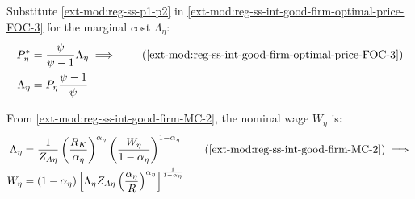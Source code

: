 \documentclass[../thesis.tex]{subfiles}
\begin{document}
Substitute \ref{ext-mod:reg-ss-p1-p2} in \ref{ext-mod:reg-ss-int-good-firm-optimal-price-FOC-3} for the marginal cost $\Lambda_{\eta}$:
\begin{align}
	P_{\eta}^{\ast} &= \frac{\psi}{\psi-1} \Lambda_{\eta} \implies \tag{\ref{ext-mod:reg-ss-int-good-firm-optimal-price-FOC-3}} \\
	\Lambda_{\eta} &= P_{\eta} \frac{\psi-1}{\psi} \label{ext-mod:reg-ss-marginal-cost}
\end{align}

From \ref{ext-mod:reg-ss-int-good-firm-MC-2}, the nominal wage $W_{\eta}$ is:
\begin{alignat}{2}
	\Lambda_{\eta} &= \frac{1}{Z_{A\eta}} \left( \frac{R_{K}}{{\alpha_{\eta}}} \right)^{{\alpha_{\eta}}} \left( \frac{W_{\eta}}{1-\alpha_{\eta}} \right)^{1-\alpha_{\eta}} \tag{\ref{ext-mod:reg-ss-int-good-firm-MC-2}} \implies \\
	W_{\eta} &= \left( 1 - \alpha_{\eta} \right) \left[ \Lambda_{\eta} Z_{A\eta} \left( \frac{\alpha_{\eta}}{R} \right)^{\alpha_{\eta}} \right]^{\frac{1}{1 - \alpha_{\eta}}} \label{ext-mod:reg-ss-nominal-wage}
\end{alignat}

\begin{comment}
	Substitute \ref{ext-mod:reg-ss-nominal-wage} in \ref{ext-mod:reg-ss-int-good-firm-MC-2} for the technology level of region 2, $Z_{A2}$:
	\begin{align}
		\Lambda_{\eta} &= \frac{1}{Z_{A\eta}} \left( \frac{R_K}{{\alpha_{\eta}}} \right)^{{\alpha_{\eta}}} \left( \frac{W}{1-\alpha_{\eta}} \right)^{1-\alpha_{\eta}} \implies \tag{\ref{ext-mod:reg-ss-int-good-firm-MC-2}} \\
		Z_{A2} &= \frac{1}{\Lambda_{}} \left( \frac{R_K}{{\alpha_{\eta}}} \right)^{{\alpha_{\eta}}} \left( \frac{W}{1-\alpha_{\eta}} \right)^{1-\alpha_{\eta}} \label{ext-mod:reg-ss-za2}
	\end{align}
\end{comment}
\end{document}
